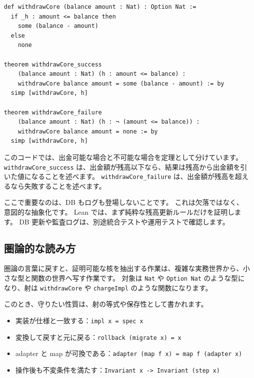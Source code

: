 \begin{listing}[htbp]
\begin{verbatim}
def withdrawCore (balance amount : Nat) : Option Nat :=
  if _h : amount <= balance then
    some (balance - amount)
  else
    none

theorem withdrawCore_success
    (balance amount : Nat) (h : amount <= balance) :
    withdrawCore balance amount = some (balance - amount) := by
  simp [withdrawCore, h]

theorem withdrawCore_failure
    (balance amount : Nat) (h : ¬ (amount <= balance)) :
    withdrawCore balance amount = none := by
  simp [withdrawCore, h]
\end{verbatim}
\caption{\texttt{withdrawCore\_success}・\texttt{withdrawCore\_failure}}
\label{lst:ch35-withdraw-core}
\end{listing}

このコードでは、出金可能な場合と不可能な場合を定理として分けています。
\texttt{withdrawCore\_success} は、出金額が残高以下なら、結果は残高から出金額を引いた値になることを述べます。
\texttt{withdrawCore\_failure} は、出金額が残高を超えるなら失敗することを述べます。

ここで重要なのは、DB もログも登場しないことです。
これは欠落ではなく、意図的な抽象化です。
Lean では、まず純粋な残高更新ルールだけを証明します。
DB 更新や監査ログは、別途統合テストや運用テストで確認します。

\subsection{圏論的な読み方}

圏論の言葉に戻すと、証明可能な核を抽出する作業は、複雑な実務世界から、小さな型と関数の世界へ写す作業です。
対象は \texttt{Nat} や \texttt{Option Nat} のような型になり、射は \texttt{withdrawCore} や \texttt{chargeImpl} のような関数になります。

このとき、守りたい性質は、射の等式や保存性として書かれます。

\begin{itemize}
\item 実装が仕様と一致する：\texttt{impl x = spec x}
\item 変換して戻すと元に戻る：\texttt{rollback (migrate x) = x}
\item adapter と map が可換である：\texttt{adapter (map f x) = map f (adapter x)}
\item 操作後も不変条件を満たす：\texttt{Invariant x -> Invariant (step x)}
\end{itemize}

